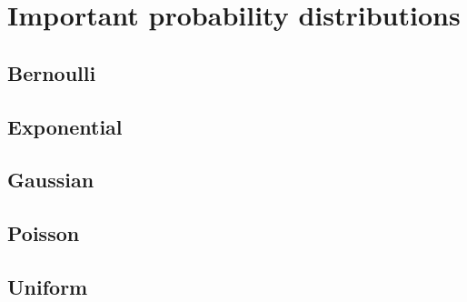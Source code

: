 \section{Important probability distributions}
\subsection*{Bernoulli}
\subsection*{Exponential}
\subsection*{Gaussian}
\subsection*{Poisson}
\subsection*{Uniform}
